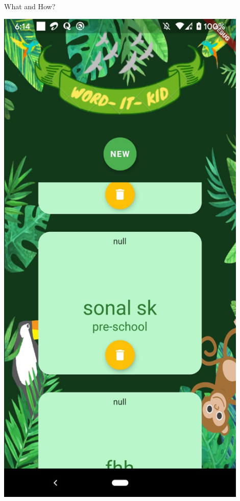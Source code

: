 \documentclass[14pt]{beamer}
\begin{document}
\begin{frame}{What and How?}
\begin{enumerate}
            \includegraphics[width=0.9\textwidth]{Issue2}

\end{enumerate}
\end{frame}
\end{document}
